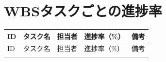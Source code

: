 
\section{WBSタスクごとの進捗率}

\begingroup
\small
\begin{longtable}{p{0.9cm}p{7cm}p{2.5cm}p{2cm}p{2cm}}
\toprule
ID & タスク名 & 担当者 & 進捗率（\%） & 備考 \\
\midrule
\endfirsthead

\toprule
ID & タスク名 & 担当者 & 進捗率（\%） & 備考 \\
\midrule
\endhead

\bottomrule
\endfoot


\end{longtable}
